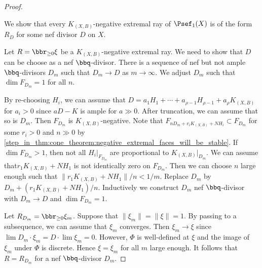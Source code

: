 \begin{proof}
        \begin{step}\label{step_in_thm:cone_theorem:negative_extremal_rays_are_rational}
            We show that every \(K_{(X,B)}\)-negative extremal ray of \(\Psef_1(X)\) is of the form \(R_D\) for some nef divisor \(D\) on \(X\).
        \end{step}
        Let \(R = \bbr_{\geq 0}\xi\) be a \(K_{(X,B)}\)-negative extremal ray.
        We need to show that \(D\) can be choose as a nef \(\bbq\)-divisor.
        There is a sequence of nef but not ample \(\bbq\)-divisors \(D_m\) such that \(D_m \to D\) as \(m \to \infty\).
        We adjust \(D_m\) such that \(\dim F_{D_m} = 1\) for all \(n\).

        By re-choosing \(H_i\), we can assume that \(D = a_1H_1 + \cdots + a_{\rho-1}H_{\rho-1} + a_\rho K_{(X,B)}\) for \(a_i > 0\) since \(aD-K\) is ample for \(a \gg 0\).
        After truncation, we can assume that so is \(D_m\).
        Then \(F_{D_m}\) is \(K_{(X,B)}\)-negative.
        Note that \(F_{nD_m+r_iK_{(X,B)} + N H_i} \subset F_{D_m}\) for some \(r_i>0\) and \(n\gg 0\) by \cref{step_in_thm:cone_theorem:negative_extremal_faces_will_be_stable}.
        If \(\dim F_{D_m} > 1\), then not all \(H_i|_{F_{D_m}}\) are proportional to \(K_{(X,B)}|_{D_m}\).
        We can assume that\(r_1K_{(X,B)}+N H_1\) is not identically zero on \(F_{D_m}\).
        Then we can choose \(n\) large enough such that \(\|r_1K_{(X,B)}+N H_1\|/n < 1/m\).
        Replace \(D_m\) by \(D_m + (r_1K_{(X,B)}+N H_1)/n\).
        Inductively we construct \(D_m\) nef \(\bbq\)-divisor with \(D_m \to D\) and \(\dim F_{D_m} = 1\).
        
        Let \(R_{D_m} = \bbr_{\geq 0} \xi_m\).
        Suppose that \(\|\xi_m\|=\|\xi\| = 1\).
        By passing to a subsequence, we can assume that \(\xi_m\) converges.
        Then \(\xi_m \to \xi\) since \(\lim D_m \cdot \xi_m = D \cdot \lim \xi_m = 0\).
        However, \(\Phi\) is well-defined at \(\xi\) and the image of \(\xi_m\) under \(\Phi\) is discrete.
        Hence \(\xi=\xi_m\) for all \(m\) large enough.
        It follows that \(R = R_{D_m}\) for a nef \(\bbq\)-divisor \(D_m\).


\end{proof}
